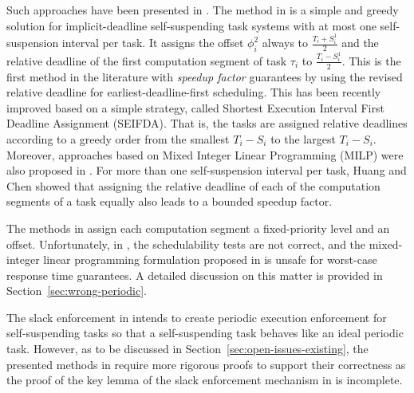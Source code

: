 Such approaches have been presented in 
\cite{RTSS-KimANR13,RTSS-ChenL14,WC16-suspend-DATE,DBLP:journals/ieicet/DingTT09}. The method in \cite{RTSS-ChenL14} is a simple and greedy solution for 
implicit-deadline self-suspending task systems with at most one self-suspension interval per task. It assigns the 
offset $\phi_i^2$ always to $\frac{T_i+S_i^1}{2}$ and the relative deadline of the first computation segment of task $\tau_i$ to 
$\frac{T_i-S_i^1}{2}$. This is the first method in the literature with \emph{speedup factor} guarantees by using the revised relative 
deadline for earliest-deadline-first scheduling. This has been recently improved 
\cite{Bruggen16RTNS} based on a simple strategy, called Shortest Execution Interval First Deadline
Assignment (SEIFDA). That is, the tasks are assigned relative deadlines according to a greedy order from the smallest $T_i-S_i$ to the largest $T_i-S_i$.
Moreover, approaches based on Mixed Integer Linear Programming (MILP) were also proposed in \cite{Peng-Fisher-RTCSA2016,Bruggen16RTNS}.
For more than one self-suspension interval per task, Huang and Chen \cite{WC16-suspend-DATE} showed that assigning the relative deadline of each of the computation segments of a task equally also leads to a bounded speedup factor.



The methods in \cite{RTSS-KimANR13,DBLP:journals/ieicet/DingTT09} assign each computation segment a fixed-priority level and an offset. 
Unfortunately,  in \cite{RTSS-KimANR13,DBLP:journals/ieicet/DingTT09}, the schedulability tests are not correct, and the mixed-integer 
linear programming formulation proposed in \cite{RTSS-KimANR13} is unsafe for worst-case response time guarantees. 
A detailed discussion on this matter is 
provided in Section~\ref{sec:wrong-periodic}.

\label{sec:slack-enforce}

The slack enforcement in \cite{LR:rtas10} intends to create periodic execution enforcement 
for self-suspending tasks so that a self-suspending task behaves like an ideal periodic task.  However, as to be discussed in 
Section~\ref{sec:open-issues-existing}, the presented methods in \cite{LR:rtas10} require more rigorous proofs to support 
their correctness as the proof of the key lemma of the slack enforcement mechanism in \cite{LR:rtas10} is incomplete.

\label{sec:multiprocessor-HRT}
  
